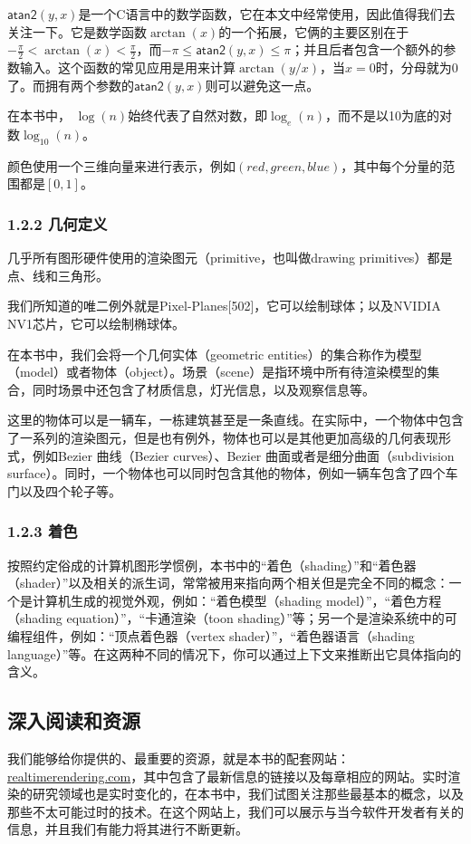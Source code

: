\documentclass[
  paper=a4,
  ,captions=tableheading
]{scrartcl}
\renewenvironment{quote}{\begin{customblockquote}\list{}{\rightmargin=0em\leftmargin=0em}%
\item\relax\color{blockquote-text}\ignorespaces}{\unskip\unskip\endlist\end{customblockquote}}
\begin{document}
\(\mathsf{atan2}(y, x)\)是一个C语言中的数学函数，它在本文中经常使用，因此值得我们去关注一下。它是数学函数\(\arctan(x)\)的一个拓展，它俩的主要区别在于\(-\frac{\pi}{2} < \arctan(x) < \frac{\pi}{2}\)，而\(-\pi  \le \mathsf{atan2}(y, x) \le \pi\)；并且后者包含一个额外的参数输入。这个函数的常见应用是用来计算\(\arctan(y/x)\)，当\(x = 0\)时，分母就为0了。而拥有两个参数的\(\mathsf{atan2}(y, x)\)则可以避免这一点。

在本书中，
\(\log(n)\)始终代表了自然对数，即\(\log_e(n)\)，而不是以10为底的对数\(\log_{10}(n)\)。

颜色使用一个三维向量来进行表示，例如\((red,green,blue)\)，其中每个分量的范围都是\([0,1]\)。

\subsubsection{1.2.2 几何定义}\label{ux51e0ux4f55ux5b9aux4e49}

几乎所有图形硬件使用的渲染图元（primitive，也叫做drawing
primitives）都是点、线和三角形。

\begin{quote}
我们所知道的唯二例外就是Pixel-Planes{[}502{]}，它可以绘制球体；以及NVIDIA
NV1芯片，它可以绘制椭球体。
\end{quote}

在本书中，我们会将一个几何实体（geometric
entities）的集合称作为模型（model）或者物体（object）。场景（scene）是指环境中所有待渲染模型的集合，同时场景中还包含了材质信息，灯光信息，以及观察信息等。

这里的物体可以是一辆车，一栋建筑甚至是一条直线。在实际中，一个物体中包含了一系列的渲染图元，但是也有例外，物体也可以是其他更加高级的几何表现形式，例如Bezier
曲线（Bezier curves）、Bezier 曲面或者是细分曲面（subdivision
surface）。同时，一个物体也可以同时包含其他的物体，例如一辆车包含了四个车门以及四个轮子等。

\subsubsection{1.2.3 着色}\label{ux7740ux8272}

按照约定俗成的计算机图形学惯例，本书中的``着色（shading）''和``着色器（shader）''以及相关的派生词，常常被用来指向两个相关但是完全不同的概念：一个是计算机生成的视觉外观，例如：``着色模型（shading
model）''，``着色方程（shading equation）''，``卡通渲染（toon
shading）''等；另一个是渲染系统中的可编程组件，例如：``顶点着色器（vertex
shader）''，``着色器语言（shading
language）''等。在这两种不同的情况下，你可以通过上下文来推断出它具体指向的含义。

\subsection{深入阅读和资源}\label{ux6df1ux5165ux9605ux8bfbux548cux8d44ux6e90}

我们能够给你提供的、最重要的资源，就是本书的配套网站：\href{http://realtimerendering.com}{realtimerendering.com}，其中包含了最新信息的链接以及每章相应的网站。实时渲染的研究领域也是实时变化的，在本书中，我们试图关注那些最基本的概念，以及那些不太可能过时的技术。在这个网站上，我们可以展示与当今软件开发者有关的信息，并且我们有能力将其进行不断更新。
\end{document}
